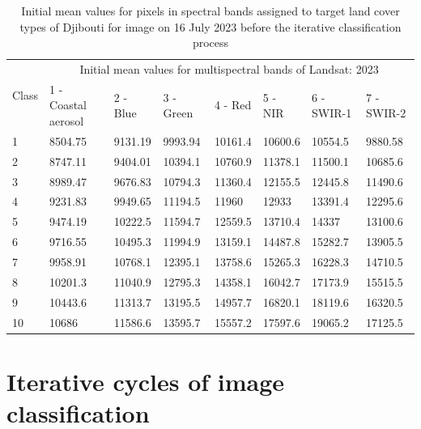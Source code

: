 \documentclass[jimaging,article,submit,pdftex,moreauthors]{Definitions/mdpi}
\begin{document}
\begin{table}[H]
  \centering
  \begin{tabularx}{\textwidth}{p{0.7cm}p{2.5cm}p{1.0cm}p{1.3cm}p{1.0cm}p{1.0cm}p{1.5cm}p{1.5cm}}
  \toprule
  \multirow{2}{*}{Class} & \multicolumn{7}{c}{Initial mean values for multispectral bands of Landsat: 2023} \\
     & 1 - Coastal aerosol & 2 - Blue & 3 - Green & 4 - Red & 5 - NIR & 6 - SWIR-1 & 7 - SWIR-2 \\
    \midrule
    1 & 8504.75 & 9131.19 & 9993.94 & 10161.4 & 10600.6 & 10554.5 & 9880.58 \\
    2 & 8747.11 & 9404.01 & 10394.1 & 10760.9 & 11378.1 & 11500.1 & 10685.6 \\
    3 & 8989.47 & 9676.83 & 10794.3 & 11360.4 & 12155.5 & 12445.8 & 11490.6 \\
    4 & 9231.83 & 9949.65 & 11194.5 & 11960 & 12933 & 13391.4 & 12295.6 \\
    5 & 9474.19 & 10222.5 & 11594.7 & 12559.5 & 13710.4 & 14337 & 13100.6 \\
    6 & 9716.55 & 10495.3 & 11994.9 & 13159.1 & 14487.8 & 15282.7 & 13905.5 \\
    7 & 9958.91 & 10768.1 & 12395.1 & 13758.6 & 15265.3 & 16228.3 & 14710.5 \\
    8 & 10201.3 & 11040.9 & 12795.3 & 14358.1 & 16042.7 &17173.9 & 15515.5 \\
    9 & 10443.6 & 11313.7 & 13195.5 & 14957.7 & 16820.1 & 18119.6 & 16320.5 \\
    10 & 10686 & 11586.6 & 13595.7 & 15557.2 & 17597.6 & 19065.2 & 17125.5 \\
\bottomrule
\end{tabularx}
  \caption{Initial mean values for pixels in spectral bands assigned to target land cover types of Djibouti for image on 16 July 2023 before the iterative classification process}
  \label{tabA4} 
\end{table}

\section[\appendixname~\thesection]{Iterative cycles of image classification}\label{AppB}
\end{document}
